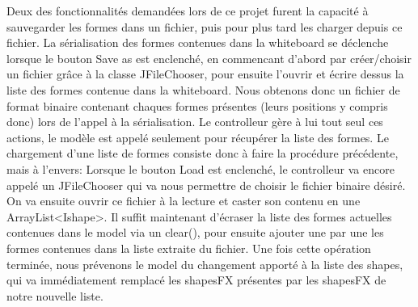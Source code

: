 Deux des fonctionnalités demandées lors de ce projet furent la capacité à
sauvegarder les formes dans un fichier, puis pour plus tard les charger
depuis ce fichier.\newline
La sérialisation des formes contenues dans la whiteboard se déclenche lorsque
le bouton Save as est enclenché, en
commencant d'abord par créer/choisir un fichier grâce à la classe JFileChooser,
pour ensuite l'ouvrir et écrire dessus la liste des formes contenue dans la
whiteboard. Nous obtenons donc un fichier de format binaire contenant chaques
formes présentes (leurs positions y compris donc) lors de l'appel à la
sérialisation. Le controlleur gère à lui tout seul ces actions, le modèle est
appelé seulement pour récupérer la liste des formes.\newline
Le chargement d'une liste de formes consiste donc à faire la procédure
précédente, mais à l'envers: Lorsque le bouton Load est enclenché, le
controlleur va encore appelé un JFileChooser qui va nous permettre de choisir
le fichier binaire désiré. On va ensuite ouvrir ce fichier à la lecture et
caster son contenu en une ArrayList<Ishape>. Il suffit maintenant d'écraser la
liste des formes actuelles contenues dans le model via un clear(), pour
ensuite ajouter une par une les formes contenues dans la liste extraite du
fichier. Une fois cette opération terminée, nous prévenons le model du
changement apporté à la liste des shapes, qui va immédiatement remplacé les
shapesFX présentes par les shapesFX de notre nouvelle liste.\newline
